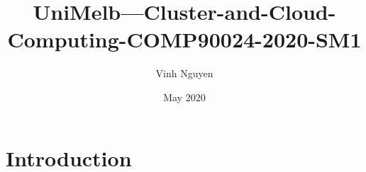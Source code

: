 \documentclass{article}
\title{UniMelb---Cluster-and-Cloud-Computing-COMP90024-2020-SM1}
\author{Vinh Nguyen}
\date{May 2020}
\begin{document}
\maketitle

\section{Introduction}
\end{document}
